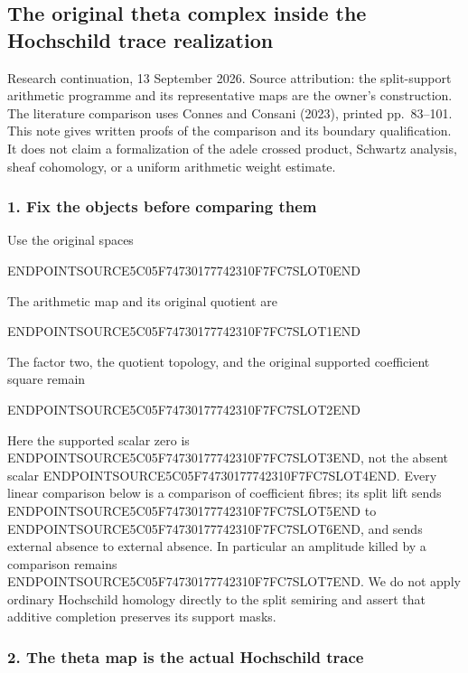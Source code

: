 \subsection{The original theta complex inside the Hochschild trace realization}\label{endpoint-cc_hochschild--the-original-theta-complex-inside-the-hochschild-trace-realization}

Research continuation, 13 September 2026. Source attribution: the split-support arithmetic programme and its representative maps are the owner's construction. The literature comparison uses Connes and Consani (2023), printed pp.~83--101. This note gives written proofs of the comparison and its boundary qualification. It does not claim a formalization of the adele crossed product, Schwartz analysis, sheaf cohomology, or a uniform arithmetic weight estimate.

\subsubsection{1. Fix the objects before comparing them}\label{endpoint-cc_hochschild--fix-the-objects-before-comparing-them}

Use the original spaces

ENDPOINTSOURCE5C05F74730177742310F7FC7SLOT0END

The arithmetic map and its original quotient are

ENDPOINTSOURCE5C05F74730177742310F7FC7SLOT1END

The factor two, the quotient topology, and the original supported coefficient square remain

ENDPOINTSOURCE5C05F74730177742310F7FC7SLOT2END

Here the supported scalar zero is ENDPOINTSOURCE5C05F74730177742310F7FC7SLOT3END, not the absent scalar ENDPOINTSOURCE5C05F74730177742310F7FC7SLOT4END. Every linear comparison below is a comparison of coefficient fibres; its split lift sends ENDPOINTSOURCE5C05F74730177742310F7FC7SLOT5END to ENDPOINTSOURCE5C05F74730177742310F7FC7SLOT6END, and sends external absence to external absence. In particular an amplitude killed by a comparison remains ENDPOINTSOURCE5C05F74730177742310F7FC7SLOT7END. We do not apply ordinary Hochschild homology directly to the split semiring and assert that additive completion preserves its support masks.

\subsubsection{2. The theta map is the actual Hochschild trace}\label{endpoint-cc_hochschild--the-theta-map-is-the-actual-hochschild-trace}

